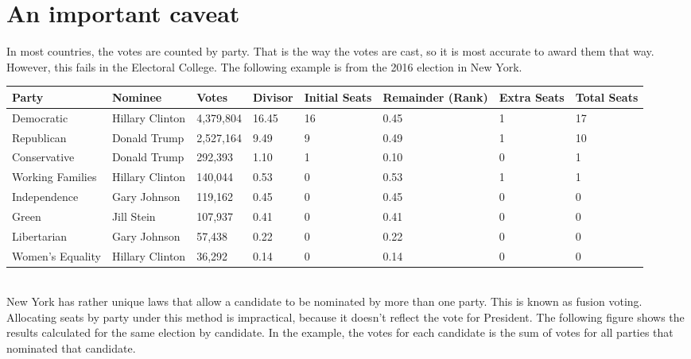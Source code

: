 \documentclass{article}
\begin{document}
    \section{An important caveat}%

    In most countries, the votes are counted by party. That is the way the votes are cast, so it is most accurate to award them that way. However, this fails in the Electoral College. The following example is from the 2016 election in New York.\\

    \begin{adjustbox}{center}
    \begin{tabular}{ |l|l|l|l|l|l|l|l| }
        \hline
        Party & Nominee & Votes & Divisor & Initial Seats & Remainder (Rank) & Extra Seats & Total Seats \\
        \hline
        Democratic & Hillary Clinton & 4,379,804 & 16.45 & 16 & 0.45 & 1 & 17 \\
        \hline
        Republican & Donald Trump & 2,527,164 & 9.49 & 9 & 0.49 & 1 & 10 \\
        \hline
        Conservative & Donald Trump & 292,393 & 1.10 & 1 & 0.10 & 0 & 1 \\
        \hline
        Working Families & Hillary Clinton & 140,044 & 0.53 & 0 & 0.53 & 1 & 1 \\
        \hline
        Independence & Gary Johnson & 119,162 & 0.45 & 0 & 0.45 & 0 & 0 \\
        \hline
        Green & Jill Stein & 107,937 & 0.41 & 0 & 0.41 & 0 & 0 \\
        \hline
        Libertarian & Gary Johnson & 57,438 & 0.22 & 0 & 0.22 & 0 & 0 \\
        \hline
        Women's Equality & Hillary Clinton & 36,292 & 0.14 & 0 & 0.14 & 0 & 0 \\
        \hline
    \end{tabular}
    \end{adjustbox} \\

    New York has rather unique laws that allow a candidate to be nominated by more than one party. This is known as fusion voting. Allocating seats by party under this method is impractical, because it doesn't reflect the vote for President. The following figure shows the results calculated for the same election by candidate. In the example, the votes for each candidate is the sum of votes for all parties that nominated that candidate.\\
\end{document}
